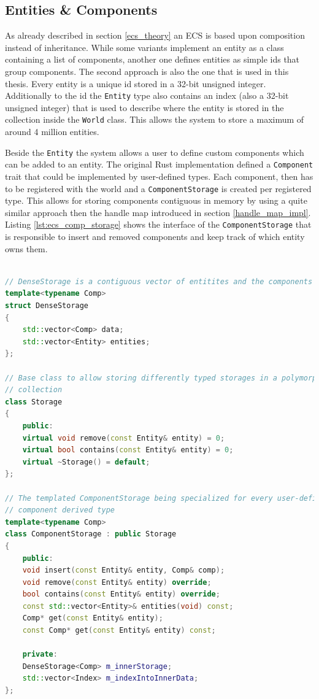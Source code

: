 \subsection{Entities \& Components}

As already described in section \ref{ecs_theory} an \ac{ECS} is based upon composition instead of inheritance. While some variants implement an entity as a class containing a list of components, another one defines entities as simple ids that group components. The second approach is also the one that is used in this thesis. Every entity is a unique id stored in a 32-bit unsigned integer. Additionally to the id the \texttt{Entity} type also contains an index (also a 32-bit unsigned integer) that is used to describe where the entity is stored in the collection inside the \texttt{World} class. This allows the system to store a maximum of around 4 million entities.

Beside the \texttt{Entity} the system allows a user to define custom components which can be added to an entity. The original Rust implementation defined a \texttt{Component} trait that could be implemented by user-defined types. Each component, then has to be registered with the world and a \texttt{ComponentStorage} is created per registered type. This allows for storing components contiguous in memory by using a quite similar approach then the handle map introduced in section \ref{handle_map_impl}. Listing \ref{lst:ecs_comp_storage} shows the interface of the \texttt{ComponentStorage} that is responsible to insert and removed components and keep track of which entity owns them.\\

\begin{lstlisting}[caption={ComponentStorage interface of the C++ implementation}, label={lst:ecs_comp_storage}, language={C++}]

// DenseStorage is a contiguous vector of entitites and the components of type C
template<typename Comp>
struct DenseStorage
{
	std::vector<Comp> data;
	std::vector<Entity> entities;
};

// Base class to allow storing differently typed storages in a polymorphic 
// collection
class Storage
{
	public:
	virtual void remove(const Entity& entity) = 0;
	virtual bool contains(const Entity& entity) = 0;
	virtual ~Storage() = default;
};

// The templated ComponentStorage being specialized for every user-defined
// component derived type
template<typename Comp>
class ComponentStorage : public Storage
{
	public:
	void insert(const Entity& entity, Comp& comp);
	void remove(const Entity& entity) override;
	bool contains(const Entity& entity) override;
	const std::vector<Entity>& entities(void) const;
	Comp* get(const Entity& entity);
	const Comp* get(const Entity& entity) const;
	
	private:
	DenseStorage<Comp> m_innerStorage;
	std::vector<Index> m_indexIntoInnerData;
};
\end{lstlisting}

